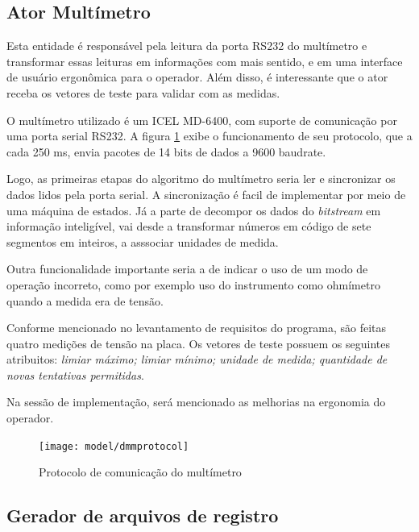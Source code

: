         \subsection{Ator Multímetro}
            \label{dmmmodel}
            
            Esta entidade é responsável pela leitura da porta RS232 do multímetro e transformar essas leituras em informações com mais sentido, e em uma interface de usuário ergonômica para o operador. Além disso, é interessante que o ator receba os vetores de teste para validar com as medidas.
            
            O multímetro utilizado é um ICEL MD-6400, com suporte de comunicação por uma porta serial RS232. A figura \ref{fig:dmmprotocol} exibe o funcionamento de seu protocolo, que a cada 250 ms, envia pacotes de 14 bits de dados a 9600 baudrate. 
            
            Logo, as primeiras etapas do algoritmo do multímetro seria ler e sincronizar os dados lidos pela porta serial. A sincronização é facil de implementar por meio de uma máquina de estados. Já a parte de decompor os dados do \textit{bitstream} em informação inteligível, vai desde a transformar números em código de sete segmentos em inteiros, a asssociar unidades de medida.
            
            Outra funcionalidade importante seria a de indicar o uso de um modo de operação incorreto, como por exemplo uso do instrumento como ohmímetro quando a medida era de tensão.
            
            Conforme mencionado no levantamento de requisitos do programa, são feitas quatro medições de tensão na placa. Os vetores de teste possuem os seguintes atribuitos: \textit{limiar máximo; limiar mínimo; unidade de medida; quantidade de novas tentativas permitidas}.
            
            Na sessão de implementação, será mencionado as melhorias na ergonomia do operador.
            
            \begin{figure}
                \centering
                \texttt{[image: model/dmmprotocol]}
                \caption{Protocolo de comunicação do multímetro}
                \label{fig:dmmprotocol}
            \end{figure}
            
        \subsection{Gerador de arquivos de registro}
        

